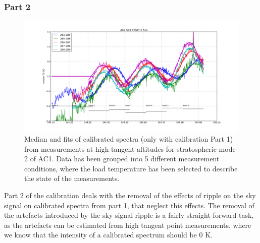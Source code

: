 \documentclass[12pt]{article}
\begin{document}

\clearpage
\newpage 

\subsubsection{Part 2}
\label{sec:part2}
\begin{figure}[!t]
\centering
\includegraphics[scale=0.35]{figures/ac1_544_strat2.png}
\caption{Median and fits of calibrated spectra 
(only with calibration Part 1) from 
measurements at high tangent altitudes
 for stratospheric mode 2 of AC1. Data has been grouped into 5 different 
 measurement conditions, where the load
 temperature has been selected to describe the state of the measurements.}
\label{fig:ac1}
\end{figure}


Part 2 of the calibration deals with the removal
of the effects of ripple on the sky signal on calibrated
spectra from part 1, that neglect this effects.
The removal of the artefacts introduced by the sky signal
ripple is a fairly straight forward task, as the artefacts
can be estimated from high tangent point measurements,
where we know that the intensity of a calibrated spectrum should be 0 K.
\end{document}
